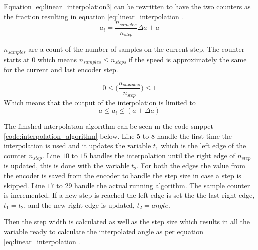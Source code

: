 
Equation \ref{eq:linear_interpolation3} can be rewritten to have the two counters as the fraction resulting in equation \ref{eq:linear_interpolation}.
\begin{equation}
a_{i} =  \frac{n_{samples}}{n_{step}} \Delta a  + a
\label{eq:linear_interpolation}
\end{equation}

$n_{samples}$ are a count of the number of samples on the current step. The counter starts at $0$ which means $n_{samples} \leq n_{steps}$ if the speed is approximately the same for the current and last encoder step.

\begin{equation}
	0 \leq	\Big(\frac{n_{samples}}{n_{step}} \Big) \leq 1
\end{equation}
Which means that the output of the interpolation is limited to
\begin{equation}
	 a \leq a_i \leq (a + \Delta a)
\end{equation}


The finished interpolation algorithm can be seen in the code snippet \ref{code:interpolation_algorithm} below.
Line $5$ to $8$ handle the first time the interpolation is used and it updates the variable $t_1$ which is the left edge of the counter $n_{step}$. Line $10$ to $15$ handles the interpolation until the right edge of $n_{step}$ is updated, this is done with the variable $t_2$. For both the edges the value from the encoder is saved from the encoder to handle the step size in case a step is skipped.
Line $17$ to $29$ handle the actual running algorithm. The sample counter is incremented. If a new step is reached the left edge is set the the last right edge, $t_1 = t_2$, and the new right edge is updated, $t_2 = angle$.

Then the step width is calculated as well as the step size which results in all the variable ready to calculate the interpolated angle as per equation \ref{eq:linear_interpolation}.

